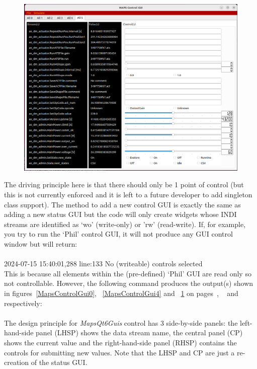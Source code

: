 \documentclass[12pt,twoside]{article}
\begin{document}
\begin{figure}[!h]
 \centering
 \includegraphics[width=0.5\linewidth]{MapsControlGui5.png}
 \caption{}
 \label{MapsControlGui5}
\end{figure}

The driving principle here is that there should only be 1 point of control (but this is not currently
enforced and it is left to a future developer to add singleton class support). The method to add a new
control GUI is exactly the same as adding a new status GUI but the code will only create widgets whose
INDI streams are identified as `wo' (write-only) or 'rw' (read-write). If, for example, you try to run the `Phil'
control GUI, it will not produce any GUI control window but will return: \\

\noindent {}\\
2024-07-15 15:40:01,288 line:133   No (writeable) controls selected\\

This is because all elements within the (pre-defined) `Phil' GUI are read only so not controllable.
However, the following command produces the output(s) shown in
figures~\ref{MapsControlGui0}, ~\ref{MapsControlGui4} and ~\ref{MapsControlGui5} on 
pages~\pageref{MapsControlGui0}, ~\pageref{MapsControlGui4} and ~\pageref{MapsControlGui5} respectively: \\

\noindent {}\\

The design principle for \emph{MapsQt6Guis} control has 3 side-by-side panels: the left-hand-side panel (LHSP) shows the data
stream name, the central panel (CP) shows the current value and the right-hand-side panel (RHSP) contains the controls for submitting new
values. Note that the LHSP and CP are just a re-creation of the status GUI.
\end{document}
